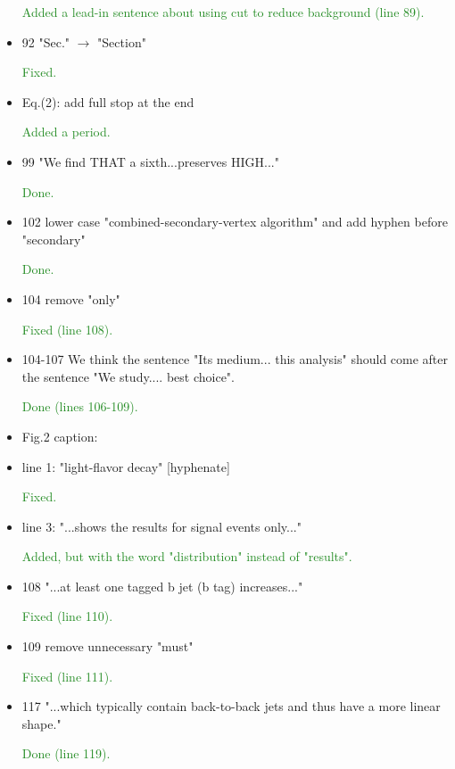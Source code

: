 \documentclass[paper=a4, fontsize=11pt]{scrartcl}
\begin{document}
\begin{itemize}
\textcolor{ForestGreen}{Added a lead-in sentence about using cut to reduce background (line 89).}

\item 92 "Sec." $\rightarrow$  "Section"

\textcolor{ForestGreen}{Fixed.}

\item Eq.(2): add full stop at the end

\textcolor{ForestGreen}{Added a period.}

\item 99 "We find THAT a sixth...preserves HIGH..."

\textcolor{ForestGreen}{Done.}

\item 102 lower case "combined-secondary-vertex algorithm"
  and add hyphen before "secondary"
  
\textcolor{ForestGreen}{Done.}

\item 104 remove "only"

\textcolor{ForestGreen}{Fixed (line 108).}

\item 104-107 We think the sentence "Its medium... this analysis" should come
after the sentence "We study.... best choice".

\textcolor{ForestGreen}{Done (lines 106-109).}

\item Fig.2 caption:
\item  line 1: "light-flavor decay" [hyphenate]

\textcolor{ForestGreen}{Fixed.}
\item  line 3: "...shows the results for signal events only..."

\textcolor{ForestGreen}{Added, but with the word "distribution" instead of "results".}

\item 108 "...at least one tagged b jet (b tag) increases..."

\textcolor{ForestGreen}{Fixed (line 110).}

\item 109 remove unnecessary "must"

\textcolor{ForestGreen}{Fixed (line 111).}

\item 117 "...which typically contain back-to-back jets and thus have
 a more linear shape."
 
\textcolor{ForestGreen}{Done (line 119).}


\end{itemize}
\end{document}
